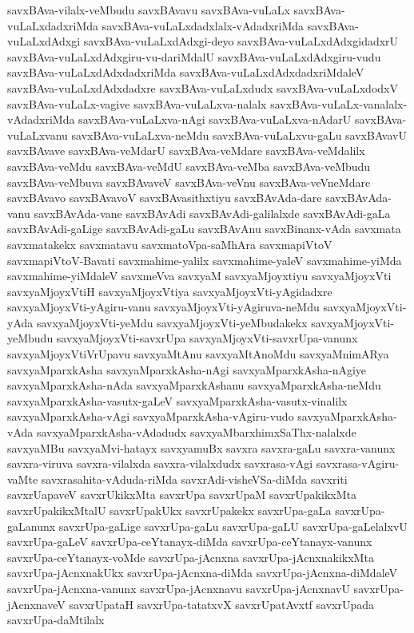 {savxBAva-vilalx-veMbudu
savxBAvavu
savxBAva-vuLaLx
savxBAva-vuLaLxdadxriMda
savxBAva-vuLaLxdadxlalx-vAdadxriMda
savxBAva-vuLaLxdAdxgi
savxBAva-vuLaLxdAdxgi-deyo
savxBAva-vuLaLxdAdxgidadxrU
savxBAva-vuLaLxdAdxgiru-vu-dariMdalU
savxBAva-vuLaLxdAdxgiru-vudu
savxBAva-vuLaLxdAdxdadxriMda
savxBAva-vuLaLxdAdxdadxriMdaleV
savxBAva-vuLaLxdAdxdadxre
savxBAva-vuLaLxdudx
savxBAva-vuLaLxdodxV
savxBAva-vuLaLx-vagive
savxBAva-vuLaLxva-nalalx
savxBAva-vuLaLx-vanalalx-vAdadxriMda
savxBAva-vuLaLxva-nAgi
savxBAva-vuLaLxva-nAdarU
savxBAva-vuLaLxvanu
savxBAva-vuLaLxva-neMdu
savxBAva-vuLaLxvu-gaLu
savxBAvavU
savxBAvave
savxBAva-veMdarU
savxBAva-veMdare
savxBAva-veMdalilx
savxBAva-veMdu
savxBAva-veMdU
savxBAva-veMba
savxBAva-veMbudu
savxBAva-veMbuva
savxBAvaveV
savxBAva-veVnu
savxBAva-veVneMdare
savxBAvavo
savxBAvavoV
savxBAvasithxtiyu
savxBAvAda-dare
savxBAvAda-vanu
savxBAvAda-vane
savxBAvAdi
savxBAvAdi-galilalxde
savxBAvAdi-gaLa
savxBAvAdi-gaLige
savxBAvAdi-gaLu
savxBAvAnu
savxBinanx-vAda
savxmata
savxmatakekx
savxmatavu
savxmatoVpa-saMhAra
savxmapiVtoV
savxmapiVtoV-Bavati
savxmahime-yalilx
savxmahime-yaleV
savxmahime-yiMda
savxmahime-yiMdaleV
savxmeVva
savxyaM
savxyaMjoyxtiyu
savxyaMjoyxVti
savxyaMjoyxVtiH
savxyaMjoyxVtiya
savxyaMjoyxVti-yAgidadxre
savxyaMjoyxVti-yAgiru-vanu
savxyaMjoyxVti-yAgiruva-neMdu
savxyaMjoyxVti-yAda
savxyaMjoyxVti-yeMdu
savxyaMjoyxVti-yeMbudakekx
savxyaMjoyxVti-yeMbudu
savxyaMjoyxVti-savxrUpa
savxyaMjoyxVti-savxrUpa-vanunx
savxyaMjoyxVtiVrUpavu
savxyaMtAnu
savxyaMtAnoMdu
savxyaMnimARya
savxyaMparxkAsha
savxyaMparxkAsha-nAgi
savxyaMparxkAsha-nAgiye
savxyaMparxkAsha-nAda
savxyaMparxkAshanu
savxyaMparxkAsha-neMdu
savxyaMparxkAsha-vasutx-gaLeV
savxyaMparxkAsha-vasutx-vinalilx
savxyaMparxkAsha-vAgi
savxyaMparxkAsha-vAgiru-vudo
savxyaMparxkAsha-vAda
savxyaMparxkAsha-vAdadudx
savxyaMbarxhimxSaThx-nalalxde
savxyaMBu
savxyaMvi-hatayx
savxyamuBx
savxra
savxra-gaLu
savxra-vanunx
savxra-viruva
savxra-vilalxda
savxra-vilalxdudx
savxrasa-vAgi
savxrasa-vAgiru-vaMte
savxrasahita-vAduda-riMda
savxrAdi-visheVSa-diMda
savxriti
savxrUapaveV
savxrUkikxMta
savxrUpa
savxrUpaM
savxrUpakikxMta
savxrUpakikxMtalU
savxrUpakUkx
savxrUpakekx
savxrUpa-gaLa
savxrUpa-gaLanunx
savxrUpa-gaLige
savxrUpa-gaLu
savxrUpa-gaLU
savxrUpa-gaLelalxvU
savxrUpa-gaLeV
savxrUpa-ceYtanayx-diMda
savxrUpa-ceYtanayx-vanunx
savxrUpa-ceYtanayx-voMde
savxrUpa-jAcnxna
savxrUpa-jAcnxnakikxMta
savxrUpa-jAcnxnakUkx
savxrUpa-jAcnxna-diMda
savxrUpa-jAcnxna-diMdaleV
savxrUpa-jAcnxna-vanunx
savxrUpa-jAcnxnavu
savxrUpa-jAcnxnavU
savxrUpa-jAcnxnaveV
savxrUpataH
savxrUpa-tatatxvX
savxrUpatAvxtf
savxrUpada
savxrUpa-daMtilalx
}
